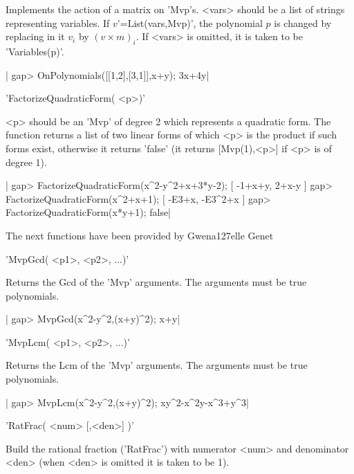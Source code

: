 Implements  the action of  a matrix on  'Mvp's. <vars> should  be a list of
strings representing variables. If $v$'=List(vars,Mvp)', the polynomial $p$
is  changed  by  replacing  in  it  $v_i$  by $(v\times m)_i$. If <vars> is
omitted, it is taken to be 'Variables(p)'.

|    gap> OnPolynomials([[1,2],[3,1]],x+y);    
    3x+4y|

%
%

'FactorizeQuadraticForm( <p>)'

<p>  should be an 'Mvp' of degree  2 which represents a quadratic form. The
function  returns a list of two linear forms of which <p> is the product if
such  forms exist, otherwise it returns 'false' (it returns [Mvp(1),<p>] if
<p> is of degree 1).

|    gap> FactorizeQuadraticForm(x^2-y^2+x+3*y-2);
    [ -1+x+y, 2+x-y ]
    gap> FactorizeQuadraticForm(x^2+x+1);        
    [ -E3+x, -E3^2+x ]
    gap> FactorizeQuadraticForm(x*y+1);  
    false|


The next functions have been provided by Gwena{\accent 127e}lle Genet


'MvpGcd( <p1>, <p2>, ...)'

Returns  the Gcd  of the  'Mvp' arguments.  The arguments  must be  true
polynomials.

|    gap> MvpGcd(x^2-y^2,(x+y)^2);
    x+y|


'MvpLcm( <p1>, <p2>, ...)'

Returns  the Lcm  of the  'Mvp' arguments.  The arguments  must be  true
polynomials.

|    gap> MvpLcm(x^2-y^2,(x+y)^2);
    xy^2-x^2y-x^3+y^3|

%
%

'RatFrac( <num> [,<den>] )'

Build the rational fraction ('RatFrac') with numerator <num> and denominator 
<den> (when <den> is omitted it is taken to be 1).

